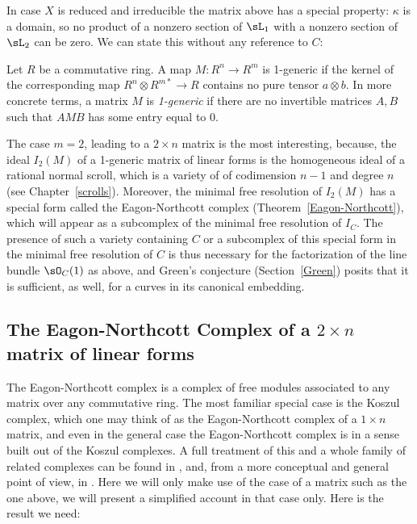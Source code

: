 In case $X$ is reduced and irreducible the matrix above has a special property: $\kappa $ is a domain, so no product of a nonzero
section of $\sL_1$ with a nonzero section of $\sL_2$ can be zero. We can state this without any reference to $C$:

\begin{definition}
Let $R$ be a commutative ring. A map $M:R^n\to R^m$ is 1-generic if the kernel of the corresponding
 map $R^{n}\otimes R^{m*} \to R$  contains no pure tensor $a\otimes b$. In more concrete terms, a matrix
$M$ is \emph{1-generic} if there are no invertible matrices $A,B$ such that  $AMB$ has some entry equal to 0.
\end{definition}

The case $m=2$, leading to a $2\times n$ matrix is the most interesting, because, the ideal $I_2(M)$ of a 1-generic matrix of linear forms is the homogeneous ideal of a rational normal 
scroll, which is a variety of of codimension $n-1$ and degree $n$ (see Chapter~\ref{scrolls}). 
Moreover, the minimal free resolution of $I_2(M)$ has a special form called the 
Eagon-Northcott complex (Theorem~\ref{Eagon-Northcott}), which will appear as a subcomplex of the minimal free resolution of $I_C$. The presence of such a variety containing $C$ or
a subcomplex of this special form in the minimal free resolution of $C$ is thus necessary for the 
factorization of the line bundle $\sO_C(1)$ as above, and Green's conjecture
(Section~\ref{Green}) posits that it is sufficient, as well, for a curves in its canonical embedding.

\subsection{The Eagon-Northcott Complex of a $2\times n$ matrix of linear forms}

The Eagon-Northcott complex is a complex of free modules associated to any matrix over any commutative ring. The most familiar special case is the Koszul complex, which one may think of as the Eagon-Northcott complex of a $1\times n$ matrix, and  even in the general case the Eagon-Northcott complex is in a sense built out of the Koszul complexes. A full treatment of this and a whole family of related complexes can be found in 
\cite[Appendix A2]{Eisenbud1995}, and, from a more conceptual and general point of view, in \cite{Weyman-book}. Here we will only
make use of the case of a matrix such as the one above, we will present a simplified account in that case only. Here is the result we need:

